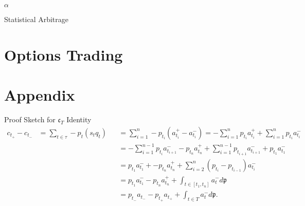 \documentclass{beamer}
\begin{document}
\begin{frame}{$\alpha$}
\end{frame}

\begin{frame}{Statistical Arbitrage}
\end{frame}

\section{Options Trading}



\section{Appendix}
\begin{frame}{Proof Sketch for $\mathfrak{c}_T$ Identity}
	\begin{align*}
			c_{t_+} - c_{t_-}	&= \sum_{t\in\tau} - p_t (s_t q_t)	&&= \sum_{i=1}^n - p_{t_i} (a_{t_i}^+-a_{t_i}^-) = - \sum_{i=1}^n p_{t_i} a_{t_i}^+ + \sum_{i=1}^n p_{t_i} a_{t_i}^-
		\\				&					&&= - \sum_{i=1}^{n-1} p_{t_i} a_{t_{i+1}}^- - p_{t_n} a_{t_n}^+ + \sum_{i=1}^{n-1} p_{t_{i+1}} a_{t_{i+1}}^- + p_{t_1}a_{t_1}^-
		\\				&					&&= p_{t_1}a_{t_1}^- + - p_{t_n} a_{t_n}^+ + \sum_{i=2}^n (p_{t_i}-p_{t_{i-1}}) a_{t_i}^-
		\\				&					&&= p_{t_1}a_{t_1}^- - p_{t_n}a_{t_n}^+ + \int_{t\in[t_1,t_n]} a_t^- d\mathfrak{p}
		\\				&					&&= p_{t_-}a_{t_-} - p_{t_+}a_{t_+} + \int_{t\in T} a_t^- d\mathfrak{p}.
	\end{align*}
\end{frame}
\end{document}
